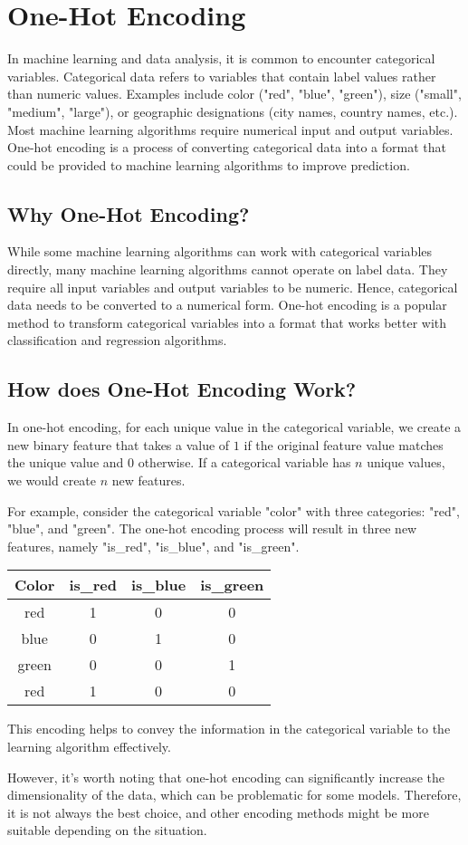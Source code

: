 \chapter{One-Hot Encoding}

In machine learning and data analysis, it is common to encounter
categorical variables. Categorical data refers to variables that
contain label values rather than numeric values. Examples include
color ("red", "blue", "green"), size ("small", "medium", "large"), or
geographic designations (city names, country names, etc.). Most
machine learning algorithms require numerical input and output
variables. One-hot encoding is a process of converting categorical
data into a format that could be provided to machine learning
algorithms to improve prediction.

\section{Why One-Hot Encoding?}

While some machine learning algorithms can work with categorical
variables directly, many machine learning algorithms cannot operate on
label data. They require all input variables and output variables to
be numeric. Hence, categorical data needs to be converted to a
numerical form. One-hot encoding is a popular method to transform
categorical variables into a format that works better with
classification and regression algorithms.

\section{How does One-Hot Encoding Work?}

In one-hot encoding, for each unique value in the categorical
variable, we create a new binary feature that takes a value of $1$ if
the original feature value matches the unique value and $0$
otherwise. If a categorical variable has $n$ unique values, we would
create $n$ new features.

For example, consider the categorical variable "color" with three
categories: "red", "blue", and "green". The one-hot encoding process
will result in three new features, namely "is\_red", "is\_blue", and
"is\_green".

\begin{tabular}{|c|c|c|c|}
\textbf{Color} & \textbf{is\_red} & \textbf{is\_blue} & \textbf{is\_green} \\
\hline
red & 1 & 0 & 0 \\
blue & 0 & 1 & 0 \\
green & 0 & 0 & 1 \\
red & 1 & 0 & 0 \\
\hline
\end{tabular}

This encoding helps to convey the information in the categorical
variable to the learning algorithm effectively.

However, it's worth noting that one-hot encoding can significantly
increase the dimensionality of the data, which can be problematic for
some models. Therefore, it is not always the best choice, and other
encoding methods might be more suitable depending on the situation.

